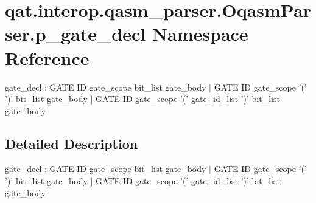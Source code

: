 \hypertarget{namespaceqat_1_1interop_1_1qasm__parser_1_1OqasmParser_1_1p__gate__decl}{\section{qat.\-interop.\-qasm\-\_\-parser.\-Oqasm\-Parser.\-p\-\_\-gate\-\_\-decl Namespace Reference}
\label{namespaceqat_1_1interop_1_1qasm__parser_1_1OqasmParser_1_1p__gate__decl}
}


gate\-\_\-decl \-: G\-A\-T\-E I\-D gate\-\_\-scope bit\-\_\-list gate\-\_\-body $|$ G\-A\-T\-E I\-D gate\-\_\-scope '(' ')' bit\-\_\-list gate\-\_\-body $|$ G\-A\-T\-E I\-D gate\-\_\-scope '(' gate\-\_\-id\-\_\-list ')' bit\-\_\-list gate\-\_\-body  




\subsection{Detailed Description}
gate\-\_\-decl \-: G\-A\-T\-E I\-D gate\-\_\-scope bit\-\_\-list gate\-\_\-body $|$ G\-A\-T\-E I\-D gate\-\_\-scope '(' ')' bit\-\_\-list gate\-\_\-body $|$ G\-A\-T\-E I\-D gate\-\_\-scope '(' gate\-\_\-id\-\_\-list ')' bit\-\_\-list gate\-\_\-body 